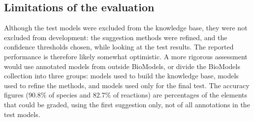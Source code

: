 \documentclass[10pt]{article}
\begin{document}
\subsection*{Limitations of the evaluation}
Although the test models were excluded from the knowledge base, they were not excluded from development: the
suggestion methods were refined, and the confidence thresholds chosen, while looking at the test results. The
reported performance is therefore likely somewhat optimistic. A more rigorous assessment would use annotated
models from outside BioModels, or divide the BioModels collection into three groups: models used to build the
knowledge base, models used to refine the methods, and models used only for the final test. The accuracy
figures (90.8\% of species and 82.7\% of reactions) are percentages of the elements that could be graded, using
the first suggestion only, not of all annotations in the test models.
\end{document}

